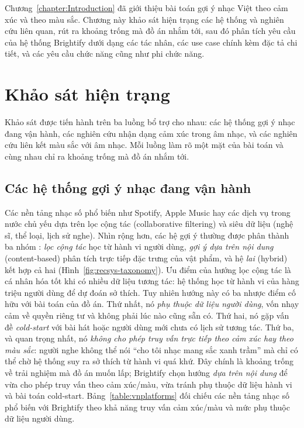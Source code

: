 \documentclass[../DoAn.tex]{subfiles}
\begin{document}
Chương~\ref{chapter:Introduction} đã giới thiệu bài toán gợi ý nhạc Việt theo cảm xúc và theo màu sắc. Chương này khảo sát hiện trạng các hệ thống và nghiên cứu liên quan, rút ra khoảng trống mà đồ án nhắm tới, sau đó phân tích yêu cầu của hệ thống Brightify dưới dạng các tác nhân, các use case chính kèm đặc tả chi tiết, và các yêu cầu chức năng cũng như phi chức năng.

\section{Khảo sát hiện trạng}
\label{section:2.1}
Khảo sát được tiến hành trên ba luồng bổ trợ cho nhau: các hệ thống gợi ý nhạc đang vận hành, các nghiên cứu nhận dạng cảm xúc trong âm nhạc, và các nghiên cứu liên kết màu sắc với âm nhạc. Mỗi luồng làm rõ một mặt của bài toán và cùng nhau chỉ ra khoảng trống mà đồ án nhắm tới.

\subsection{Các hệ thống gợi ý nhạc đang vận hành}
\label{subsection:2.1.1}
Các nền tảng nhạc số phổ biến như Spotify, Apple Music hay các dịch vụ trong nước chủ yếu dựa trên lọc cộng tác (collaborative filtering) và siêu dữ liệu (nghệ sĩ, thể loại, lịch sử nghe). Nhìn rộng hơn, các hệ gợi ý thường được phân thành ba nhóm \cite{aggarwal2016recsys}: \textit{lọc cộng tác} học từ hành vi người dùng, \textit{gợi ý dựa trên nội dung} (content-based) phân tích trực tiếp đặc trưng của vật phẩm, và hệ \textit{lai} (hybrid) kết hợp cả hai \cite{burke2002hybrid} (Hình~\ref{fig:recsys-taxonomy}). Ưu điểm của hướng lọc cộng tác là cá nhân hóa tốt khi có nhiều dữ liệu tương tác: hệ thống học từ hành vi của hàng triệu người dùng để dự đoán sở thích. Tuy nhiên hướng này có ba nhược điểm cố hữu với bài toán của đồ án. Thứ nhất, nó \textit{phụ thuộc dữ liệu người dùng}, vốn nhạy cảm về quyền riêng tư và không phải lúc nào cũng sẵn có. Thứ hai, nó gặp vấn đề \textit{cold-start} \cite{schein2002coldstart} với bài hát hoặc người dùng mới chưa có lịch sử tương tác. Thứ ba, và quan trọng nhất, nó \textit{không cho phép truy vấn trực tiếp theo cảm xúc hay theo màu sắc}: người nghe không thể nói ``cho tôi nhạc mang sắc xanh trầm'' mà chỉ có thể chờ hệ thống suy ra sở thích từ hành vi quá khứ. Đây chính là khoảng trống về trải nghiệm mà đồ án muốn lấp; Brightify chọn hướng \textit{dựa trên nội dung} để vừa cho phép truy vấn theo cảm xúc/màu, vừa tránh phụ thuộc dữ liệu hành vi và bài toán cold-start. Bảng~\ref{table:vnplatforms} đối chiếu các nền tảng nhạc số phổ biến với Brightify theo khả năng truy vấn cảm xúc/màu và mức phụ thuộc dữ liệu người dùng.
\end{document}
